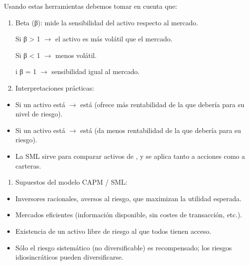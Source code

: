 \documentclass[letterpaper,10pt,spanish]{sphinxmanual}
\begin{document}
\sphinxAtStartPar
Usando estas herramientas debemos tomar en cuenta que:
\begin{enumerate}
%
\item {} 
\sphinxAtStartPar
Beta (β): mide la sensibilidad del activo respecto al mercado.

\sphinxAtStartPar
Si β \textgreater{} 1 \(\rightarrow\) el activo es más volátil que el mercado.

\sphinxAtStartPar
Si β \textless{} 1 \(\rightarrow\) menos volátil.

\sphinxAtStartPar
i β = 1 \(\rightarrow\) sensibilidad igual al mercado.

\item {} 
\sphinxAtStartPar
Interpretaciones prácticas:

\end{enumerate}
\begin{itemize}
\item {} 
\sphinxAtStartPar
Si un activo está  \(\rightarrow\) está  (ofrece más rentabilidad de la que debería para su nivel de riesgo).

\item {} 
\sphinxAtStartPar
Si un activo está  \(\rightarrow\) está  (da menos rentabilidad de la que debería para su riesgo).

\item {} 
\sphinxAtStartPar
La SML sirve para comparar activos de , y se aplica tanto a acciones como a carteras.

\end{itemize}
\begin{enumerate}
%
\setcounter{enumi}{2}
\item {} 
\sphinxAtStartPar
Supuestos del modelo CAPM / SML:

\end{enumerate}
\begin{itemize}
\item {} 
\sphinxAtStartPar
Inversores racionales, aversos al riesgo, que maximizan la utilidad esperada.

\item {} 
\sphinxAtStartPar
Mercados eficientes (información disponible, sin costes de transacción, etc.).

\item {} 
\sphinxAtStartPar
Existencia de un activo libre de riesgo al que todos tienen acceso.

\item {} 
\sphinxAtStartPar
Sólo el riesgo sistemático (no diversificable) es recompensado; los riesgos idiosincráticos pueden diversificarse.

\end{itemize}
\end{document}
